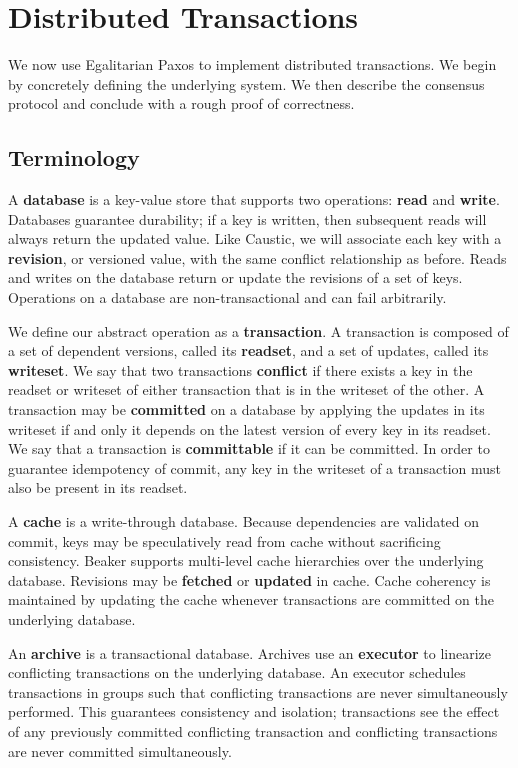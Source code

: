 \documentclass{article}
\begin{document}
  \section{Distributed Transactions}
  We now use Egalitarian Paxos to implement distributed transactions. We begin by concretely
  defining the underlying system. We then describe the consensus protocol and conclude with a rough
  proof of correctness.

    \subsection{Terminology}
    A \textbf{database} is a key-value store that supports two operations: \textbf{read} and
    \textbf{write}. Databases guarantee durability; if a key is written, then subsequent
    reads will always return the updated value. Like Caustic, we will associate each key with a
    \textbf{revision}, or versioned value, with the same conflict relationship as before. Reads and
    writes on the database return or update the revisions of a set of keys. Operations on a database
    are non-transactional and can fail arbitrarily.

    We define our abstract operation as a \textbf{transaction}. A transaction is composed of a set
    of dependent versions, called its \textbf{readset}, and a set of updates, called its
    \textbf{writeset}. We say that two transactions \textbf{conflict} if there exists a key in the
    readset or writeset of either transaction that is in the writeset of the other. A transaction may
    be \textbf{committed} on a database by applying the updates in its writeset if and only it
    depends on the latest version of every key in its readset. We say that a transaction is
    \textbf{committable} if it can be committed. In order to guarantee idempotency of commit, any key
    in the writeset of a transaction must also be present in its readset.

    A \textbf{cache} is a write-through database. Because dependencies are validated on commit, keys
    may be speculatively read from cache without sacrificing consistency. Beaker supports multi-level
    cache hierarchies over the underlying database. Revisions may be \textbf{fetched} or
    \textbf{updated} in cache. Cache coherency is maintained by updating the cache whenever
    transactions are committed on the underlying database.

    An \textbf{archive} is a transactional database. Archives use an \textbf{executor} to linearize
    conflicting transactions on the underlying database. An executor schedules transactions in groups
    such that conflicting transactions are never simultaneously performed. This guarantees consistency
    and isolation; transactions see the effect of any previously committed conflicting transaction and
    conflicting transactions are never committed simultaneously.
\end{document}
